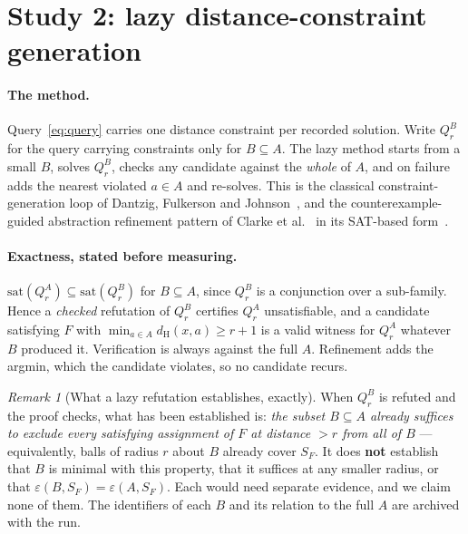 \documentclass[11pt,a4paper]{article}
\theoremstyle{plain}
\theoremstyle{definition}
\theoremstyle{remark}
\newtheorem{remark}[theorem]{Remark}
\newcommand{\dH}{d_{\mathrm{H}}}
\newcommand{\SF}{S_F}
\begin{document}
\section{Study 2: lazy distance-constraint generation}\label{sec:stage2}

\paragraph{The method.} Query~\eqref{eq:query} carries one distance constraint
per recorded solution. Write $Q_r^B$ for the query carrying constraints only for
$B \subseteq A$. The lazy method starts from a small $B$, solves $Q_r^B$, checks
any candidate against the \emph{whole} of $A$, and on failure adds the nearest
violated $a \in A$ and re-solves. This is the classical constraint-generation
loop of Dantzig, Fulkerson and Johnson~\cite{dantzig1954tsp}, and the
counterexample-guided abstraction refinement pattern of Clarke et
al.~\cite{clarke2000cegar,clarke2002satcegar} in its SAT-based
form~\cite{clarke2002satcegar}.

\paragraph{Exactness, stated before measuring.}
$\mathrm{sat}(Q_r^A) \subseteq \mathrm{sat}(Q_r^B)$ for $B \subseteq A$, since
$Q_r^B$ is a conjunction over a sub-family. Hence a \emph{checked} refutation of
$Q_r^B$ certifies $Q_r^A$ unsatisfiable, and a candidate satisfying $F$ with
$\min_{a \in A}\dH(x,a) \ge r+1$ is a valid witness for $Q_r^A$ whatever $B$
produced it. Verification is always against the full $A$. Refinement adds the
argmin, which the candidate violates, so no candidate recurs.

\begin{remark}[What a lazy refutation establishes, exactly]\label{rem:subset}
When $Q_r^B$ is refuted and the proof checks, what has been established is:
\emph{the subset $B \subseteq A$ already suffices to exclude every satisfying
assignment of $F$ at distance $> r$ from all of $B$} --- equivalently, balls of
radius $r$ about $B$ already cover $\SF$. It does \textbf{not} establish that
$B$ is minimal with this property, that it suffices at any smaller radius, or
that $\varepsilon(B,\SF) = \varepsilon(A,\SF)$. Each would need separate
evidence, and we claim none of them. The identifiers of each $B$ and its
relation to the full $A$ are archived with the run.
\end{remark}
\end{document}
